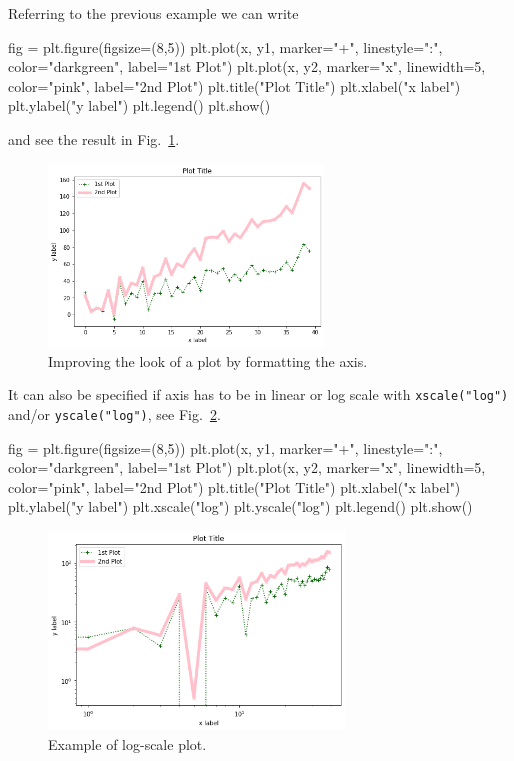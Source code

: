Referring to the previous example we can write

\begin{ipython}
fig = plt.figure(figsize=(8,5))
plt.plot(x, y1, marker="+", linestyle=":", color="darkgreen", label="1st Plot")
plt.plot(x, y2, marker="x", linewidth=5, color="pink", label="2nd Plot")
plt.title("Plot Title")
plt.xlabel("x label")
plt.ylabel("y label")
plt.legend()
plt.show()
\end{ipython}
\noindent
and see the result in Fig.~\ref{fig:axis1}.

\begin{figure}[htb]
	\centering
	\includegraphics[width=0.65\textwidth]{figures/axis1}
	\caption{Improving the look of a plot by formatting the axis.}
	\label{fig:axis1}
\end{figure}

It can also be specified if axis has to be in linear or log scale with \texttt{xscale("log")} and/or \texttt{yscale("log")}, see Fig.~\ref{fig:axis2}.

\begin{ipython}
fig = plt.figure(figsize=(8,5))
plt.plot(x, y1, marker="+", linestyle=":", color="darkgreen", label="1st Plot")
plt.plot(x, y2, marker="x", linewidth=5, color="pink", label="2nd Plot")
plt.title("Plot Title")
plt.xlabel("x label")
plt.ylabel("y label")
plt.xscale("log")
plt.yscale("log")
plt.legend()
plt.show()
\end{ipython}

\begin{figure}[htb]
	\centering
	\includegraphics[width=0.7\textwidth]{figures/axis2}
	\caption{Example of log-scale plot.}
	\label{fig:axis2}
\end{figure}

